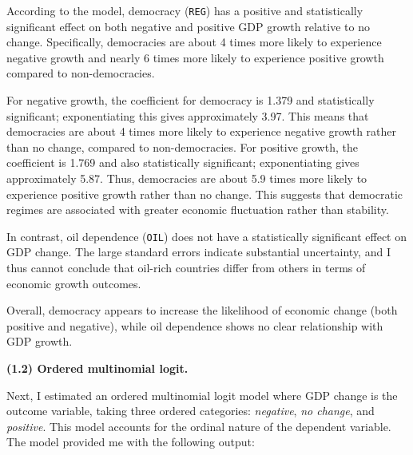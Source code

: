 \documentclass[12pt,letterpaper]{article}
\begin{document}
According to the model, democracy (\texttt{REG}) has a positive and statistically significant effect on both negative and positive GDP growth relative to no change. Specifically, democracies are about 4 times more likely to experience negative growth and nearly 6 times more likely to experience positive growth compared to non-democracies. 

For negative growth, the coefficient for democracy is 1.379 and statistically significant; exponentiating this gives approximately 3.97. This means that democracies are about 4 times more likely to experience negative growth rather than no change, compared to non-democracies. For positive growth, the coefficient is 1.769 and also statistically significant; exponentiating gives approximately 5.87. Thus, democracies are about 5.9 times more likely to experience positive growth rather than no change. This suggests that democratic regimes are associated with greater economic fluctuation rather than stability.

In contrast, oil dependence (\texttt{OIL}) does not have a statistically significant effect on GDP change. The large standard errors indicate substantial uncertainty, and I thus cannot conclude that oil-rich countries differ from others in terms of economic growth outcomes. 

Overall, democracy appears to increase the likelihood of economic change (both positive and negative), while oil dependence shows no clear relationship with GDP growth.

\vspace{1cm}

\noindent \textbf{(1.2) Ordered multinomial logit.}


\noindent Next, I estimated an ordered multinomial logit model where GDP change is the outcome variable, taking three ordered categories: \textit{negative}, \textit{no change}, and \textit{positive}. This model accounts for the ordinal nature of the dependent variable. The model provided me with the following output: 
\end{document}
